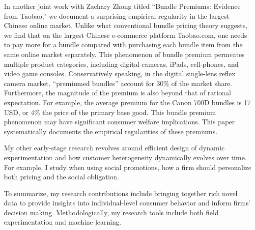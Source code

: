\documentclass{article}
\begin{document}
In another joint work with Zachary Zhong titled “Bundle Premiums: Evidence from Taobao," we document a surprising empirical regularity in the largest Chinese online market. Unlike what conventional bundle pricing theory suggests, we find that on the largest Chinese e-commerce platform Taobao.com, one needs to pay more for a bundle compared with purchasing each bundle item from the same online market separately. This phenomenon of bundle premium permeates multiple product categories, including digital cameras, iPads, cell-phones, and video game consoles. Conservatively speaking, in the digital single-lens reflex camera market, ``premiumed bundles'' account for 30\% of the market share. Furthermore, the magnitude of the premium is also beyond that of rational expectation. For example, the average premium for the Canon 700D bundles is  17 USD, or 4\% the price of the primary base good.  This bundle premium phenomenon may have significant consumer welfare implications. This paper systematically documents the empirical regularities of these premiums.
\noindent
\raggedright
My other early-stage research revolves around  efficient design of dynamic experimentation and how customer heterogeneity dynamically evolves over time. For example, I study when using social promotions, how a firm should personalize both pricing and the social obligation. 
\noindent
\raggedright
To summarize, my research contributions include bringing together rich novel data to provide insights into individual-level consumer behavior and inform firms’ decision making. Methodologically, my research tools include both field experimentation and machine learning. 
\newpage


\end{document}
